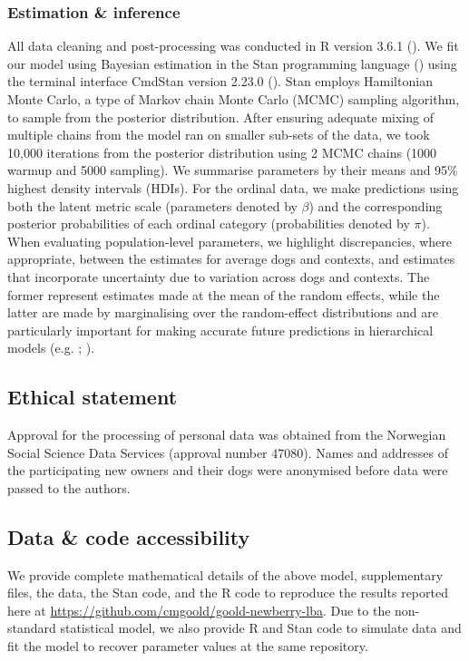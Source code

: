 \documentclass[12pt]{article}
\begin{document}
\subsubsection{Estimation \& inference}
All data cleaning and post-processing was conducted in R version 3.6.1 (\cite{rcoreteam2019}). We fit our model using Bayesian estimation in the Stan programming language (\cite{stan2018}) using the terminal interface CmdStan version 2.23.0 (\cite{cmdstan2018}). Stan employs Hamiltonian Monte Carlo, a type of Markov chain Monte Carlo (MCMC) sampling algorithm, to sample from the posterior distribution. After ensuring adequate mixing of multiple chains from the model ran on smaller sub-sets of the data, we took 10,000 iterations from the posterior distribution using 2 MCMC chains (1000 warmup and 5000 sampling). We summarise parameters by their means and 95\% highest density intervals (HDIs). For the ordinal data, we make predictions using both the latent metric scale (parameters denoted by $\beta$) and the corresponding posterior probabilities of each ordinal category (probabilities denoted by $\pi$). When evaluating population-level parameters, we highlight discrepancies, where appropriate, between the estimates for average dogs and contexts, and estimates that incorporate uncertainty due to variation across dogs and contexts. The former represent estimates made at the mean of the random effects, while the latter are made by marginalising over the random-effect distributions and are particularly important for making accurate future predictions in hierarchical models (e.g. \cite{inthout2016}; \cite{wang2019}).

\subsection{Ethical statement}
Approval for the processing of personal data was obtained from the Norwegian Social Science Data Services (approval number 47080). Names and addresses of the participating new owners and their dogs were anonymised before data were passed to the authors.

\subsection{Data \& code accessibility}
We provide complete mathematical details of the above model, supplementary files, the data, the Stan code, and the R code to reproduce the results reported here at  \url{https://github.com/cmgoold/goold-newberry-lba}. Due to the non-standard statistical model, we also provide R and Stan code to simulate data and fit the model to recover parameter values at the same repository.
\end{document}

